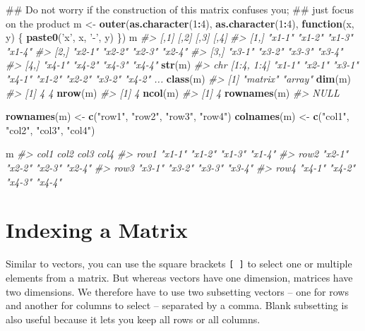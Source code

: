 \documentclass[]{book}
\newenvironment{Shaded}{\begin{snugshade}}{\end{snugshade}}
\newcommand{\KeywordTok}[1]{\textcolor[rgb]{0.13,0.29,0.53}{\textbf{#1}}}
\newcommand{\DecValTok}[1]{\textcolor[rgb]{0.00,0.00,0.81}{#1}}
\newcommand{\StringTok}[1]{\textcolor[rgb]{0.31,0.60,0.02}{#1}}
\newcommand{\CommentTok}[1]{\textcolor[rgb]{0.56,0.35,0.01}{\textit{#1}}}
\newcommand{\ControlFlowTok}[1]{\textcolor[rgb]{0.13,0.29,0.53}{\textbf{#1}}}
\newcommand{\OperatorTok}[1]{\textcolor[rgb]{0.81,0.36,0.00}{\textbf{#1}}}
\newcommand{\NormalTok}[1]{#1}
\begin{document}
\begin{Shaded}
\begin{Highlighting}[]
\NormalTok{## Do not worry if the construction of this matrix confuses you; }
\NormalTok{## just focus on the product}
\NormalTok{m <-}\StringTok{ }\KeywordTok{outer}\NormalTok{(}\KeywordTok{as.character}\NormalTok{(}\DecValTok{1}\OperatorTok{:}\DecValTok{4}\NormalTok{), }\KeywordTok{as.character}\NormalTok{(}\DecValTok{1}\OperatorTok{:}\DecValTok{4}\NormalTok{),}
              \ControlFlowTok{function}\NormalTok{(x, y) \{}
                \KeywordTok{paste0}\NormalTok{(}\StringTok{'x'}\NormalTok{, x, }\StringTok{'-'}\NormalTok{, y)}
\NormalTok{                \})}
\NormalTok{m}
\CommentTok{#>      [,1]   [,2]   [,3]   [,4]  }
\CommentTok{#> [1,] "x1-1" "x1-2" "x1-3" "x1-4"}
\CommentTok{#> [2,] "x2-1" "x2-2" "x2-3" "x2-4"}
\CommentTok{#> [3,] "x3-1" "x3-2" "x3-3" "x3-4"}
\CommentTok{#> [4,] "x4-1" "x4-2" "x4-3" "x4-4"}
\KeywordTok{str}\NormalTok{(m)}
\CommentTok{#>  chr [1:4, 1:4] "x1-1" "x2-1" "x3-1" "x4-1" "x1-2" "x2-2" "x3-2" "x4-2" ...}
\KeywordTok{class}\NormalTok{(m)}
\CommentTok{#> [1] "matrix" "array"}
\KeywordTok{dim}\NormalTok{(m)}
\CommentTok{#> [1] 4 4}
\KeywordTok{nrow}\NormalTok{(m)}
\CommentTok{#> [1] 4}
\KeywordTok{ncol}\NormalTok{(m)}
\CommentTok{#> [1] 4}
\KeywordTok{rownames}\NormalTok{(m)}
\CommentTok{#> NULL}

\KeywordTok{rownames}\NormalTok{(m) <-}\StringTok{ }\KeywordTok{c}\NormalTok{(}\StringTok{"row1"}\NormalTok{, }\StringTok{"row2"}\NormalTok{, }\StringTok{"row3"}\NormalTok{, }\StringTok{"row4"}\NormalTok{)}
\KeywordTok{colnames}\NormalTok{(m) <-}\StringTok{ }\KeywordTok{c}\NormalTok{(}\StringTok{"col1"}\NormalTok{, }\StringTok{"col2"}\NormalTok{, }\StringTok{"col3"}\NormalTok{, }\StringTok{"col4"}\NormalTok{)}

\NormalTok{m}
\CommentTok{#>      col1   col2   col3   col4  }
\CommentTok{#> row1 "x1-1" "x1-2" "x1-3" "x1-4"}
\CommentTok{#> row2 "x2-1" "x2-2" "x2-3" "x2-4"}
\CommentTok{#> row3 "x3-1" "x3-2" "x3-3" "x3-4"}
\CommentTok{#> row4 "x4-1" "x4-2" "x4-3" "x4-4"}
\end{Highlighting}
\end{Shaded}

\section{Indexing a Matrix}\label{indexing-a-matrix}

Similar to vectors, you can use the square brackets \texttt{{[}\ {]}} to
select one or multiple elements from a matrix. But whereas vectors have
one dimension, matrices have two dimensions. We therefore have to use
two subsetting vectors -- one for rows and another for columns to select
-- separated by a comma. Blank subsetting is also useful because it lets
you keep all rows or all columns.
\end{document}
